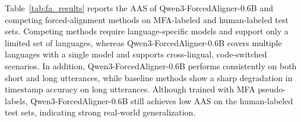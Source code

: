 
Table~\ref{tab:fa_results} reports the AAS of Qwen3-ForcedAligner-0.6B and competing forced-alignment methods on MFA-labeled and human-labeled test sets. Competing methods require language-specific models and support only a limited set of languages, whereas Qwen3-ForcedAligner-0.6B covers multiple languages with a single model and supports cross-lingual, code-switched scenarios. In addition, Qwen3-ForcedAligner-0.6B performs consistently on both short and long utterances, while baseline methods show a sharp degradation in timestamp accuracy on long utterances. Although trained with MFA pseudo-labels, Qwen3-ForcedAligner-0.6B still achieves low AAS on the human-labeled test sets, indicating strong real-world generalization.
